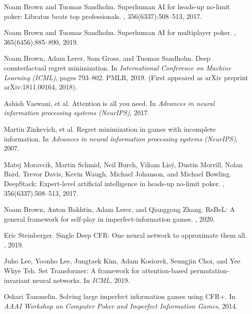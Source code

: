 \documentclass[11pt,a4paper]{article}
\begin{document}
 
\begin{thebibliography}{99}

Noam Brown and Tuomas Sandholm.
\newblock Superhuman AI for heads-up no-limit poker: Libratus beats top professionals.
, 356(6337):508--513, 2017.

Noam Brown and Tuomas Sandholm.
\newblock Superhuman AI for multiplayer poker.
, 365(6456):885--890, 2019.

Noam Brown, Adam Lerer, Sam Gross, and Tuomas Sandholm.
\newblock Deep counterfactual regret minimization.
\newblock In {\em International Conference on Machine Learning (ICML)}, pages 793--802. PMLR, 2019. (First appeared as arXiv preprint arXiv:1811.00164, 2018).

Ashish Vaswani, et al.
\newblock Attention is all you need.
\newblock In {\em Advances in neural information processing systems (NeurIPS)}, 2017.

Martin Zinkevich, et al.
\newblock Regret minimization in games with incomplete information.
\newblock In {\em Advances in neural information processing systems (NeurIPS)}, 2007.

Matej Moravcik, Martin Schmid, Neil Burch, Viliam Lisý, Dustin Morrill, Nolan Bard, Trevor Davis, Kevin Waugh, Michael Johanson, and Michael Bowling.
\newblock DeepStack: Expert-level artificial intelligence in heads-up no-limit poker.
, 356(6337):508--513, 2017.

Noam Brown, Anton Bakhtin, Adam Lerer, and Qianggong Zhang.
\newblock ReBeL: A general framework for self-play in imperfect-information games.
, 2020.

Eric Steinberger.
\newblock Single Deep CFR: One neural network to approximate them all.
, 2019.

Juho Lee, Yoonho Lee, Jungtaek Kim, Adam Kosiorek, Seungjin Choi, and Yee Whye Teh.
\newblock Set Transformer: A framework for attention-based permutation-invariant neural networks.
\newblock In {\em ICML}, 2019.

Oskari Tammelin.
\newblock Solving large imperfect information games using CFR+.
\newblock In {\em AAAI Workshop on Computer Poker and Imperfect Information Games}, 2014.


\end{thebibliography}
\end{document}
